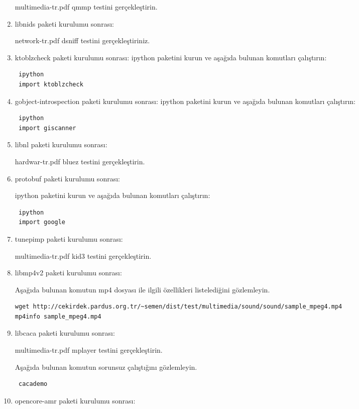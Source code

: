 \documentclass[a4paper,10pt]{article}
\begin{document}
\begin{enumerate}
multimedia-tr.pdf qmmp testini gerçekleştirin.

\item libnids paketi kurulumu sonrası:

network-tr.pdf dsniff testini gerçekleştiriniz.

\item ktoblzcheck paketi kurulumu sonrası:
ipython paketini kurun ve aşağıda bulunan komutları çalıştırın:
\begin{verbatim}
 ipython
 import ktoblzcheck
\end{verbatim}


\item gobject-introspection paketi kurulumu sonrası:
ipython paketini kurun ve aşağıda bulunan komutları çalıştırın:
\begin{verbatim}
 ipython
 import giscanner
\end{verbatim}


\item libnl paketi kurulumu sonrası:

hardwar-tr.pdf bluez testini gerçekleştirin.
\item protobuf paketi kurulumu sonrası:

ipython paketini kurun ve aşağıda bulunan komutları çalıştırın:
\begin{verbatim}
 ipython
 import google
\end{verbatim}
\item tunepimp paketi kurulumu sonrası:

multimedia-tr.pdf kid3 testini gerçekleştirin.

\item libmp4v2 paketi kurulumu sonrası:

Aşağıda bulunan komutun mp4 dosyası ile ilgili özellikleri listelediğini gözlemleyin.
\begin{verbatim}
wget http://cekirdek.pardus.org.tr/~semen/dist/test/multimedia/sound/sound/sample_mpeg4.mp4
mp4info sample_mpeg4.mp4 
\end{verbatim}

\item libcaca paketi kurulumu sonrası:

multimedia-tr.pdf mplayer testini gerçekleştirin.

Aşağıda bulunan komutun sorunsuz çalıştığını gözlemleyin.
\begin{verbatim}
 cacademo
\end{verbatim}

\item opencore-amr paketi kurulumu sonrası:


\end{enumerate}
\end{document}
